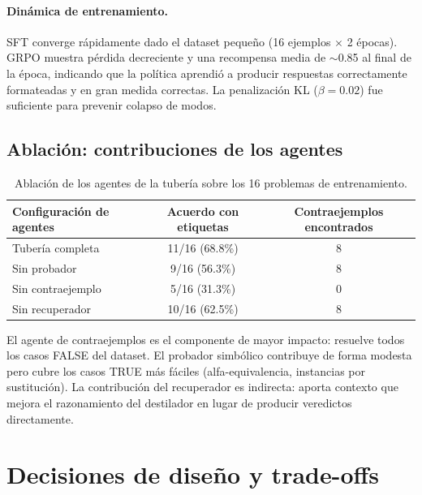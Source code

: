 \documentclass{article}
\begin{document}
\paragraph{Din\'amica de entrenamiento.} SFT converge r\'apidamente dado el dataset peque\~no (16 ejemplos $\times$ 2 \'epocas). GRPO muestra p\'erdida decreciente y una recompensa media de $\sim$0.85 al final de la \'epoca, indicando que la pol\'itica aprendi\'o a producir respuestas correctamente formateadas y en gran medida correctas. La penalizaci\'on KL ($\beta{=}0.02$) fue suficiente para prevenir colapso de modos.

\subsection{Ablaci\'on: contribuciones de los agentes}

\begin{table}[h]
  \caption{Ablaci\'on de los agentes de la tuber\'ia sobre los 16 problemas de entrenamiento.}
  \label{tab:ablation}
  \centering
  \begin{tabular}{lcc}
    \toprule
    Configuraci\'on de agentes & Acuerdo con etiquetas & Contraejemplos encontrados \\
    \midrule
    Tuber\'ia completa & 11/16 (68.8\%) & 8 \\
    Sin probador & 9/16 (56.3\%) & 8 \\
    Sin contraejemplo & 5/16 (31.3\%) & 0 \\
    Sin recuperador & 10/16 (62.5\%) & 8 \\
    \bottomrule
  \end{tabular}
\end{table}

El agente de contraejemplos es el componente de mayor impacto: resuelve todos los casos FALSE del dataset. El probador simb\'olico contribuye de forma modesta pero cubre los casos TRUE m\'as f\'aciles (alfa-equivalencia, instancias por sustituci\'on). La contribuci\'on del recuperador es indirecta: aporta contexto que mejora el razonamiento del destilador en lugar de producir veredictos directamente.

\section{Decisiones de dise\~no y trade-offs}
\label{sec:tradeoffs}
\end{document}
